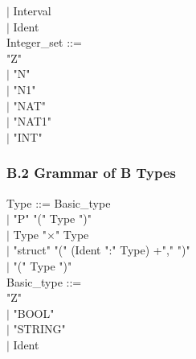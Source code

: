 \documentclass[12pt,a4paper,draft]{report}
\begin{document}
{\begin{sloppypar}
\hspace*{0.20in} $|$  Interval\\ 
\hspace*{0.20in} $|$ Ident \\ 
Integer\_set ::= \\ 
\hspace*{0.20in}  "Z"\\ 
\hspace*{0.20in} $|$ "N" \\ 
\hspace*{0.20in} $|$ "N1" \\ 
\hspace*{0.20in} $|$ "NAT" \\ 
\hspace*{0.20in} $|$ "NAT1" \\ 
\hspace*{0.20in} $|$ "INT" \\ 
\subsubsection{B.2 Grammar of B Types }
Type ::=  Basic\_type\\ 
 \hspace*{0.20in} $|$ "P"  "(" Type ")" \\ 
 \hspace*{0.20in} $|$  Type  "$\times$"  Type \\ 
\hspace*{0.20in} $|$ "struct" "(" (Ident ":" Type) +"," ")" \\ 
\hspace*{0.20in} $|$ "(" Type ")" \\ 
Basic\_type ::= \\ 
\hspace*{0.20in}  "Z" \\ 
\hspace*{0.20in} $|$ "BOOL"\\ 
\hspace*{0.20in} $|$ "STRING"\\ 
\hspace*{0.20in} $|$ Ident \\


\end{sloppypar} 
}
\end{document}
